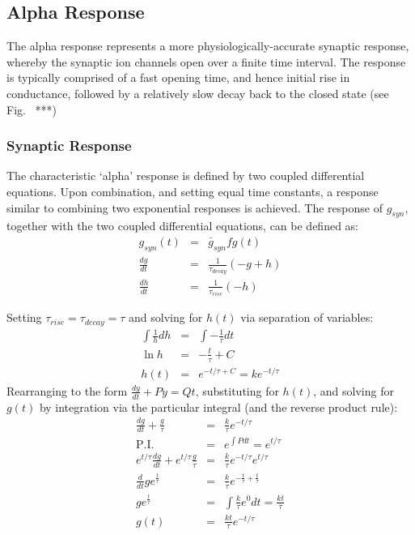 \documentclass[12pt]{article}
\begin{document}
\subsection{Alpha Response}
The alpha response represents a more physiologically-accurate synaptic response,
whereby the synaptic ion channels open over a finite time interval. The
response is typically comprised of a fast opening time, and hence initial rise
in conductance, followed by a relatively slow decay back to the closed state (see
Fig.~ ***)

\subsubsection*{Synaptic Response}
The characteristic `alpha' response is defined by two coupled differential
equations.  Upon combination, and setting equal time constants, a response
similar to combining two exponential responses is achieved. The response of
$g_{syn}$, together with the two coupled differential equations, can be defined
as:
\begin{eqnarray}
g_{syn}(t) & = & \bar{g}_{syn}fg(t) \nonumber \\
\frac{dg}{dt} & = & \frac{1}{\tau_{decay}} (-g + h) \nonumber \\
\frac{dh}{dt} & = & \frac{1}{\tau_{rise}}(-h) \nonumber
\label{eqn:alpha_coupled_diff_eqns}
\end{eqnarray}

Setting $\tau_{rise}=\tau_{decay} = \tau$ and solving for $h(t)$ via separation
of variables:
\begin{eqnarray}
\int \frac{1}{h} dh & = & \int -\frac{1}{\tau}dt \nonumber \\
\ln{h}&=&-\frac{t}{\tau} + C \nonumber \\
h(t) & = & e^{-{t/\tau}+C} = ke^{-t / \tau} \nonumber
\label{eqn:solve_for_h}
\end{eqnarray}
Rearranging to the form $\frac{dy}{dt} +Py = Qt$, substituting  for $h(t)$, and
solving for $g(t)$ by integration via the particular integral (and the reverse
product rule):
\begin{eqnarray}
\frac{dg}{dt} + \frac{g}{\tau}&=&\frac{k}{\tau}e^{-t/\tau} \nonumber\\
\mathrm{P.I.}&=& e^{\int P dt} = e^{t/ \tau} \nonumber \\
e^{t/\tau}\frac{dg}{dt} + e^{t/\tau}\frac{g}{\tau}
&=& \frac{k}{\tau}e^{-t/\tau}e^{t/\tau} \nonumber \\
\frac{d}{dt} g e^{\frac{t}{\tau}}&=&\frac{k}{\tau}e^{-\frac{t}{\tau}
+\frac{t}{\tau}} \nonumber \\
g e^{\frac{t}{\tau}} &=& \int \frac{k}{\tau}e^0 dt  =  \frac{kt}{\tau} \nonumber \\
g(t)&=&\frac{kt}{\tau}e^{-t/\tau}
\end{eqnarray}
\end{document}
